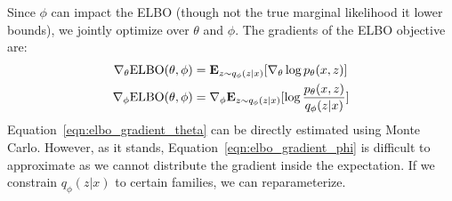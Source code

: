 Since $\phi$ can impact the ELBO (though not the true marginal likelihood it lower bounds), we jointly optimize over  $\theta$ and $\phi$.
The gradients of the ELBO objective are:
\begin{align}
    \nabla_\theta \textup{ELBO}(\theta, \phi) &= \mathbf{E}_{z \sim q_\phi(z|x)}[\nabla_\theta \log p_\theta(x,z)] \label{eqn:elbo_gradient_theta} \\
    \nabla_\phi \textup{ELBO}(\theta, \phi) &= \nabla_\phi \mathbf{E}_{z \sim q_\phi(z|x)}[\log \frac{p_\theta(x,z)}{q_\phi(z|x)}]
    \label{eqn:elbo_gradient_phi}
\end{align}
Equation~\ref{eqn:elbo_gradient_theta} can be directly estimated using Monte Carlo. However, as it stands, Equation~\ref{eqn:elbo_gradient_phi} is difficult to approximate as we cannot distribute the gradient inside the expectation. If we constrain $q_\phi(z|x)$ to certain families, we can reparameterize.







